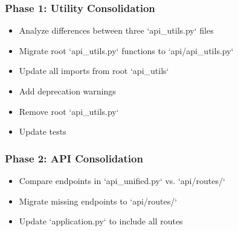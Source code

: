 \documentclass[11pt,a4paper]{article}
\begin{document}
\subsubsection{Phase 1: Utility Consolidation}

\begin{itemize}
\item [ ] Analyze differences between three `api_utils.py` files
\end{itemize}

\begin{itemize}
\item [ ] Migrate root `api_utils.py` functions to `api/api_utils.py`
\end{itemize}

\begin{itemize}
\item [ ] Update all imports from root `api_utils`
\end{itemize}

\begin{itemize}
\item [ ] Add deprecation warnings
\end{itemize}

\begin{itemize}
\item [ ] Remove root `api_utils.py`
\end{itemize}

\begin{itemize}
\item [ ] Update tests
\end{itemize}

\subsubsection{Phase 2: API Consolidation}

\begin{itemize}
\item [ ] Compare endpoints in `api_unified.py` vs. `api/routes/`
\end{itemize}

\begin{itemize}
\item [ ] Migrate missing endpoints to `api/routes/`
\end{itemize}

\begin{itemize}
\item [ ] Update `application.py` to include all routes
\end{itemize}
\end{document}
